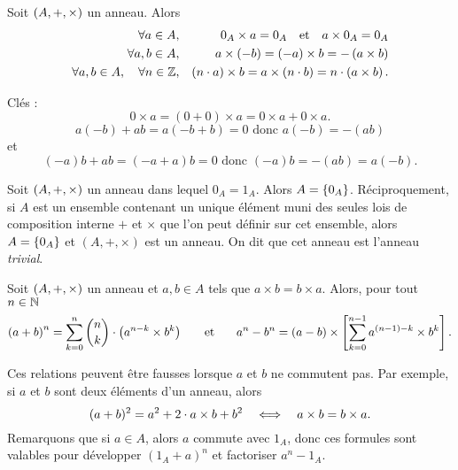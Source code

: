 \documentclass{magnolia}
\begin{document}


\begin{proposition}
Soit $\left(A,+,\times\right)$ un anneau. Alors
\begin{eqnarray*}
\forall a\in A, & & 0_A \times a=0_A \quad\text{et}\quad a \times 0_A = 0_A\\
\forall a,b\in A, & & a\times\left(-b\right)=\left(-a\right)\times b=-\left(a\times b\right)\\
\forall a,b\in A ,\quad \forall n\in\mathbb{Z}, & &
  \left(n\cdot a\right)\times b=a\times\left(n\cdot b\right)=n\cdot\left(a\times b\right).
\end{eqnarray*}
\end{proposition}

\begin{preuve}
Clés : 
$$0\times a=(0+0)\times a=0\times a + 0\times a.$$
$$a(-b)+ab=a(-b+b)=0 \text{ donc } a(-b)=-(ab)$$
et $$(-a)b+ab=(-a+a)b=0 \text{ donc } (-a)b=-(ab)=a(-b).$$
\end{preuve}

\begin{remarqueUnique}
\remarque Soit $\left(A,+,\times\right)$ un anneau dans lequel $0_A=1_A$. Alors $A=\left\{0_A\right\}$. Réciproquement, si $A$ est un ensemble contenant un unique élément muni des seules lois de composition interne $+$ et $\times$ que l'on peut définir sur cet ensemble, alors $A=\left\{0_A\right\}$ et $(A,+,\times)$ est un anneau. On dit que cet anneau est l'anneau \emph{trivial}.
\end{remarqueUnique}

\begin{proposition}
Soit $\left(A,+,\times\right)$ un anneau et $a,b\in A$ tels que $a\times b=b\times a$.
Alors, pour tout $n\in\mathbb{N}$
\[\left(a+b\right)^n = \sum_{k=0}^n \binom{n}{k} \cdot \left(a^{n-k} \times b^k\right) \quad\quad\!\text{et}\quad\!\quad
  a^n-b^n=\left(a-b\right)\times\left[\sum_{k=0}^{n-1} a^{\left(n-1\right)-k}\times b^k\right].\]
\end{proposition}

\begin{remarques}
\remarque Ces relations peuvent être fausses lorsque $a$ et $b$ ne commutent
  pas. Par exemple, si $a$ et $b$ sont deux éléments d'un anneau, alors
  \[(a+b)^2=a^2+2\cdot a\times b+b^2 \quad\Longleftrightarrow\quad a\times b=b\times a.\]
\remarque Remarquons que si $a\in A$, alors $a$ commute
  avec $1_A$, donc ces formules sont valables pour développer $(1_A+a)^n$ et
  factoriser $a^n-1_A$.
\end{remarques}
\end{document}
